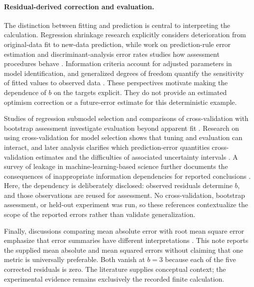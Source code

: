 \documentclass[11pt]{article}
\begin{document}
\paragraph{Residual-derived correction and evaluation.}
The distinction between fitting and prediction is central to interpreting the calculation. Regression shrinkage research explicitly considers deterioration from original-data fit to new-data prediction, while work on prediction-rule error estimation and discriminant-analysis error rates studies how assessment procedures behave \cite{Copas1983RegressionPrediction,Efron1983EstimatingError,Lachenbruch1968EstimationError}. Information criteria account for adjusted parameters in model identification, and generalized degrees of freedom quantify the sensitivity of fitted values to observed data \cite{Akaike1974NewLook,Ye1998MeasuringCorrecting}. These perspectives motivate making the dependence of $b$ on the targets explicit. They do not provide an estimated optimism correction or a future-error estimate for this deterministic example.

Studies of regression submodel selection and comparisons of cross-validation with bootstrap assessment investigate evaluation beyond apparent fit \cite{Breiman1992SubmodelSelection,Kohavi1995CrossvalidationBootstrap}. Research on using cross-validation for model selection shows that tuning and evaluation can interact, and later analysis clarifies which prediction-error quantities cross-validation estimates and the difficulties of associated uncertainty intervals \cite{Varma2006BiasError,Bates2023CrossvalidationWhat}. A survey of leakage in machine-learning-based science further documents the consequences of inappropriate information dependencies for reported conclusions \cite{Kapoor2023LeakageReproducibility}. Here, the dependency is deliberately disclosed: observed residuals determine $b$, and those observations are reused for assessment. No cross-validation, bootstrap assessment, or held-out experiment was run, so these references contextualize the scope of the reported errors rather than validate generalization.

Finally, discussions comparing mean absolute error with root mean square error emphasize that error summaries have different interpretations \cite{Willmott2005AdvantagesMean}. This note reports the supplied mean absolute and mean squared errors without claiming that one metric is universally preferable. Both vanish at $b=3$ because each of the five corrected residuals is zero. The literature supplies conceptual context; the experimental evidence remains exclusively the recorded finite calculation.
\end{document}
